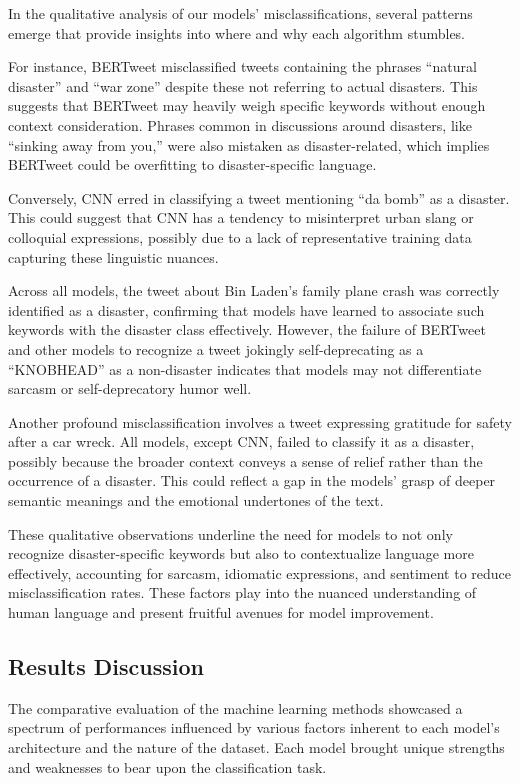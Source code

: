 \documentclass[10pt,table]{article}
\begin{document}
In the qualitative analysis of our models' misclassifications, several patterns emerge that provide insights into where and why each algorithm stumbles. 

For instance, BERTweet misclassified tweets containing the phrases \enquote{natural disaster} and \enquote{war zone} despite these not referring to actual disasters. This suggests that BERTweet may heavily weigh specific keywords without enough context consideration. Phrases common in discussions around disasters, like \enquote{sinking away from you,} were also mistaken as disaster-related, which implies BERTweet could be overfitting to disaster-specific language.

Conversely, CNN erred in classifying a tweet mentioning \enquote{da bomb} as a disaster. This could suggest that CNN has a tendency to misinterpret urban slang or colloquial expressions, possibly due to a lack of representative training data capturing these linguistic nuances. 

Across all models, the tweet about Bin Laden's family plane crash was correctly identified as a disaster, confirming that models have learned to associate such keywords with the disaster class effectively. However, the failure of BERTweet and other models to recognize a tweet jokingly self-deprecating as a \enquote{KNOBHEAD} as a non-disaster indicates that models may not differentiate sarcasm or self-deprecatory humor well.

Another profound misclassification involves a tweet expressing gratitude for safety after a car wreck. All models, except CNN, failed to classify it as a disaster, possibly because the broader context conveys a sense of relief rather than the occurrence of a disaster. This could reflect a gap in the models' grasp of deeper semantic meanings and the emotional undertones of the text.

These qualitative observations underline the need for models to not only recognize disaster-specific keywords but also to contextualize language more effectively, accounting for sarcasm, idiomatic expressions, and sentiment to reduce misclassification rates. These factors play into the nuanced understanding of human language and present fruitful avenues for model improvement.


\subsection{Results Discussion}
The comparative evaluation of the machine learning methods showcased a spectrum of performances influenced by various factors inherent to each model's architecture and the nature of the dataset. Each model brought unique strengths and weaknesses to bear upon the classification task.
\end{document}

